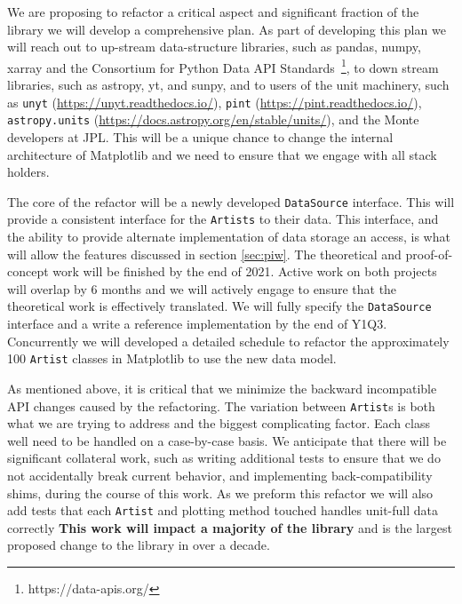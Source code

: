 \documentclass[12pt]{article}
\numberwithin{page}{section}
\begin{document}


We are proposing to refactor a critical aspect and significant
fraction of the library we will develop a comprehensive plan.  As part
of developing this plan we will reach out to up-stream data-structure
libraries, such as pandas, numpy, xarray and the Consortium for Python
Data API Standards~\footnote{https://data-apis.org/}, to down stream
libraries, such as astropy, yt, and sunpy, and to users of the unit
machinery, such as \texttt{unyt}
(\url{https://unyt.readthedocs.io/}), \texttt{pint}
(\url{https://pint.readthedocs.io/}), \texttt{astropy.units}
(\url{https://docs.astropy.org/en/stable/units/}), and the Monte
developers at JPL.  This will be a unique chance to change the
internal architecture of Matplotlib and we need to ensure that we
engage with all stack holders.

The core of the refactor will be a newly developed \texttt{DataSource}
interface.  This will provide a consistent interface for the
\texttt{Artists} to their data.  This interface, and the ability to
provide alternate implementation of data storage an access, is what
will allow the features discussed in section \ref{sec:piw}.  The
theoretical and proof-of-concept work will be finished by the end of
2021.  Active work on both projects will overlap by 6 months and we
will actively engage to ensure that the theoretical work is
effectively translated.  We will fully specify the \texttt{DataSource}
interface and a write a reference implementation by the end of Y1Q3.
Concurrently we will developed a detailed schedule to refactor the
approximately 100 \texttt{Artist} classes in Matplotlib to use the new
data model.

As mentioned above, it is critical that we minimize the backward
incompatible API changes caused by the refactoring.  The variation
between \texttt{Artist}s is both what we are trying to address and the
biggest complicating factor.  Each class well need to be handled on a
case-by-case basis.  We anticipate that there will be significant
collateral work, such as writing additional tests to ensure that we do
not accidentally break current behavior, and implementing
back-compatibility shims, during the course of this work.  As we
preform this refactor we will also add tests that each \texttt{Artist}
and plotting method touched handles unit-full data correctly
\textbf{This work will impact a majority of the library} and is the
largest proposed change to the library in over a decade.
\end{document}
